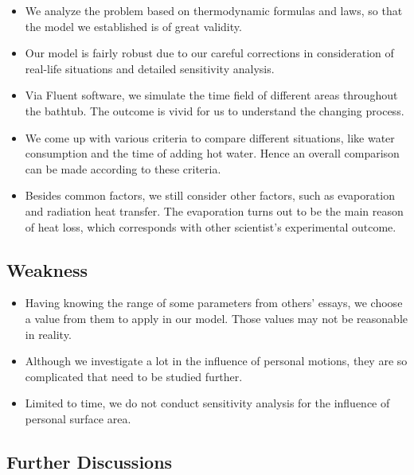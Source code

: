 \begin{itemize}
\item We analyze the problem based on thermodynamic formulas and laws, so that the model we established is of great validity.

\item Our model is fairly robust due to our careful corrections in consideration of real-life situations and detailed sensitivity analysis.

\item Via Fluent software, we simulate the time field of different areas throughout the bathtub. The outcome is vivid for us to understand the changing process.

\item We come up with various criteria to compare different situations, like water consumption and the time of adding hot water. Hence an overall comparison can be made according to these criteria.

\item Besides common factors, we still consider other factors, such as evaporation and radiation heat transfer. The evaporation turns out to be the main reason of heat loss, which corresponds with other scientist’s experimental outcome.
\end{itemize}

\subsection{Weakness}

\begin{itemize}
\item Having knowing the range of some parameters from others’ essays, we choose a value from them to apply in our model. Those values may not be reasonable in reality.

\item Although we investigate a lot in the influence of personal motions, they are so complicated that need to be studied further.

\item Limited to time, we do not conduct sensitivity analysis for the influence of personal surface area.
\end{itemize}

\subsection{Further Discussions}